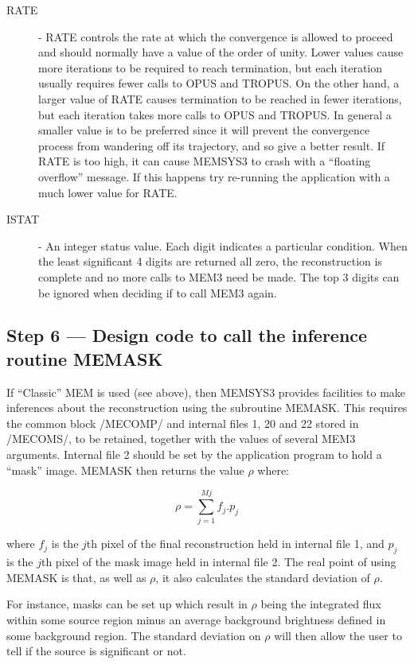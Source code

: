 \begin {description}
\item [RATE] - RATE controls the rate at which the convergence is allowed to 
proceed and should normally have a value of the order of unity. Lower values 
cause more iterations to be required to reach termination, but each iteration 
usually requires fewer calls to OPUS and TROPUS. On the other hand, a larger 
value of RATE causes termination to be reached in fewer iterations, but each 
iteration takes more calls to OPUS and TROPUS. In general a smaller value is to 
be preferred since it will prevent the convergence process from wandering off
its  trajectory, and so give a better result. If RATE is too high, it can cause 
MEMSYS3 to crash with a ``floating overflow'' message. If this happens try 
re-running the application with a much lower value for RATE.

\item [ISTAT] - An integer status value. Each digit indicates a particular 
condition. When the least significant 4 digits are returned all zero, the 
reconstruction is complete and no more calls to MEM3 need be made. The top 3 
digits can be ignored when deciding if to call MEM3 again.
\end {description}

\subsection {Step 6 --- Design code to call the inference routine MEMASK}

If ``Classic'' MEM is used (see above), then MEMSYS3 provides facilities to
make  inferences about the reconstruction using the subroutine MEMASK. This
requires  the common block /MECOMP/ and internal files 1, 20 and 22 stored in
/MECOMS/, to  be retained, together with the values of several MEM3 arguments.
Internal file 2  should be set by the application program to hold a ``mask''
image. MEMASK  then returns the value $\rho$ where:

\begin {equation}
\rho=\sum_{j=1}^{Mj} f_{j}.p_{j}
\end {equation}

where $f_{j}$ is the $j$th pixel of the final reconstruction held in internal 
file 1, and $p_{j}$ is the $j$th pixel of the mask image held in internal file 
2. The real point of using MEMASK is that, as well as $\rho$, it also 
calculates the standard deviation of $\rho$.

For instance, masks can be set up which result in $\rho$ being the integrated 
flux within some source region minus an average background brightness defined
in  some background region. The standard deviation on $\rho$ will then allow
the  user to tell if the source is significant or not. 

